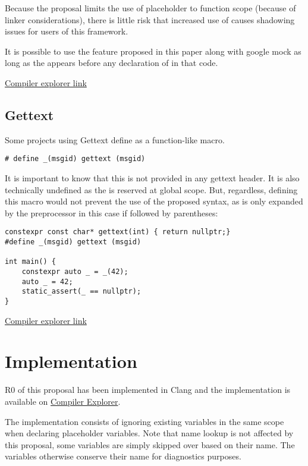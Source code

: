 \documentclass{wg21}
\begin{document}
{Because the proposal limits the use of placeholder to function scope (because of linker considerations),
there is little risk that increased use of \tcode{_} causes shadowing issues for users of this framework.

It is possible to use the feature proposed in this paper along with google mock as long as the 
appears before any declaration of \tcode{_} in that code.

\href{https://godbolt.org/z/EghbHF}{Compiler explorer link}

\subsection{Gettext}

Some projects using Gettext define \tcode{_} as a function-like macro.

\begin{lstlisting}[style=color]
# define _(msgid) gettext (msgid)
\end{lstlisting}

It is important to know that this is not provided in any gettext header.
It is also technically undefined as the \tcode{_} is reserved at global scope.
But, regardless, defining this macro would not prevent the use of the proposed syntax, as \tcode{_} is only
expanded by the preprocessor in this case if followed by parentheses:

\begin{lstlisting}[style=color]
constexpr const char* gettext(int) { return nullptr;}
#define _(msgid) gettext (msgid)

int main() {
    constexpr auto _ = _(42);
    auto _ = 42;
    static_assert(_ == nullptr);
}

\end{lstlisting}

\href{https://godbolt.org/z/FRFg9-}{Compiler explorer link}

\section{Implementation}

R0 of this proposal has been implemented in Clang and the implementation is available on \href{https://godbolt.org/z/5lmnfN}{Compiler Explorer}.

The implementation consists of ignoring existing \tcode{_} variables in the same scope when declaring placeholder variables.
Note that name lookup is not affected by this proposal, some variables are simply skipped over based on their name.
The variables otherwise conserve their name for diagnostics purposes.

}
\end{document}
